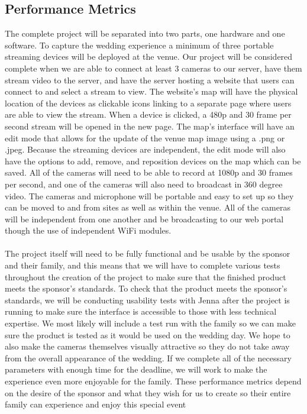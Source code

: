 \documentclass[onecolumn, draftclsnofoot,10pt, compsoc]{IEEEtran}
\begin{document}
    \subsection{Performance Metrics}
    The complete project will be separated into two parts, one hardware and one software.
    To capture the wedding experience a minimum of three portable streaming devices will be deployed at the venue. 
    Our project will be considered complete when we are able to connect at least 3 cameras to our server, have them stream video to the server, and have the server hosting a website that users can connect to and select a stream to view. 
    The website's map will have the physical location of the devices as clickable icons linking to a separate page where users are able to view the stream. 
    When a device is clicked, a 480p and 30 frame per second stream will be opened in the new page. 
    The map’s interface will have an edit mode that allows for the update of the venue map image using a .png or .jpeg. 
    Because the streaming devices are independent, the edit mode will also have the options to add, remove, and reposition devices on the map which can be saved. 
    All of the cameras will need to be able to record at 1080p and 30 frames per second, and one of the cameras will also need to broadcast in 360 degree video.
    The cameras and microphone will be portable and easy to set up so they can be moved to and from sites as well as within the venue. 
    All of the cameras will be independent from one another and be broadcasting to our web portal though the use of independent WiFi modules. 
    \\
    \\
    The project itself will need to be fully functional and be usable by the sponsor and their family, and this means that we will have to complete various tests throughout the creation of the project to make sure that the finished product meets the sponsor's standards.
    To check that the product meets the sponsor's standards, we will be conducting usability tests with Jenna after the project is running to make sure the interface is accessible to those with less technical expertise. 
    We most likely will include a test run with the family so we can make sure the product is tested as it would be used on the wedding day. 
    We hope to also make the cameras themselves visually attractive so they do not take away from the overall appearance of the wedding. 
    If we complete all of the necessary parameters with enough time for the deadline, we will work to make the experience even more enjoyable for the family. 
    These performance metrics depend on the desire of the sponsor and what they wish for us to create so their entire family can experience and enjoy this special event
\newpage
\end{document}
